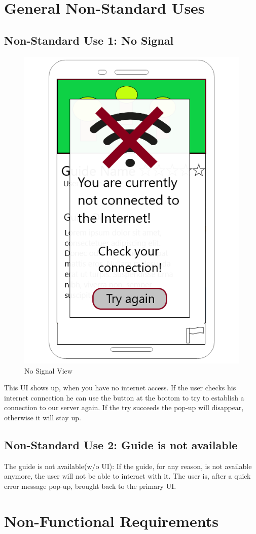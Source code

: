 \documentclass[12pt]{article}
\theoremstyle{definition}
\newenvironment{text}{
   \setlength{\parindent}{0pt}
   \color{black}
}{}
\begin{document}
\section{General Non-Standard Uses}
\label{sec:gnsu}
\subsection{Non-Standard Use 1: No Signal}
    \begin{figure}[hbt!]
        \centering
        \includegraphics[width=0.35\linewidth]{UIs/NoWifiSignal.png}
        \caption{No Signal View}
        \label{fig:usecase1}
    \end{figure}
    \begin{text}
    This UI shows up, when you have no internet access. If the user checks his internet connection he can use the button at the bottom to try to establish a connection to our server again. If the try succeeds the pop-up will disappear, otherwise it will stay up.
    \end{text}
\subsection{Non-Standard Use 2: Guide is not available}
    \begin{text}
    The guide is not available(w/o UI):
    If the guide, for any reason, is not available anymore, the user will not be able to interact with it. The user is, after a quick error message pop-up, brought back to the primary UI.
    \end{text}
    
\pagebreak

\section{Non-Functional Requirements}
\end{document}
